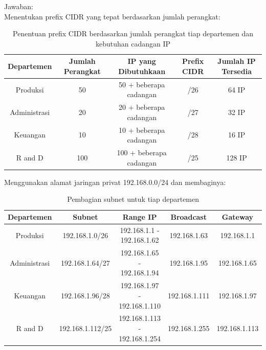 \begin{enumerate}
    Jawaban:
    \\Menentukan prefix CIDR yang tepat berdasarkan jumlah perangkat:
    \begin{table}[h]
    \centering
    \label{tabel1}
    \begin{tabular}{|c|c|c|c|c|}
      \hline
      Departemen & Jumlah Perangkat & IP yang Dibutuhkaan & Prefix CIDR & Jumlah IP Tersedia \\
      \hline
      Produksi & 50 & 50 + beberapa cadangan & /26 & 64 IP \\
      Administrasi & 20 & 20 + beberapa cadangan & /27 & 32 IP \\
      Keuangan & 10 & 10 + beberapa cadangan & /28 & 16 IP \\
      R and D & 100 & 100 + beberapa cadangan & /25 & 128 IP \\
      \hline
    \end{tabular}
    \caption{Penentuan prefix CIDR berdasarkan jumlah perangkat tiap departemen dan kebutuhan cadangan IP}
    \end{table}
    
    Menggunakan alamat jaringan privat 192.168.0.0/24 dan membaginya:
    \begin{table}[H]
    \centering
    \begin{tabular}{|c|c|c|c|c|}
      \hline
      Departemen & Subnet & Range IP & Broadcast & Gateway \\
      \hline
      Produksi & 192.168.1.0/26 & 192.168.1.1 - 192.168.1.62 & 192.168.1.63 & 192.168.1.1 \\
      Administrasi & 192.168.1.64/27 & 192.168.1.65 - 192.168.1.94 & 192.168.1.95 & 192.168.1.65 \\
      Keuangan & 192.168.1.96/28 & 192.168.1.97 - 192.168.1.110 & 192.168.1.111 & 192.168.1.97 \\
      R and D & 192.168.1.112/25 & 192.168.1.113 - 192.168.1.254 & 192.168.1.255 & 192.168.1.113 \\
      \hline
    \end{tabular}
    \caption{Pembagian subnet untuk tiap departemen}
    \end{table}
    

\end{enumerate}
